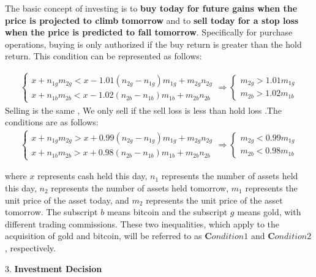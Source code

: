\documentclass{mcmthesis}
\begin{document}
The basic concept of investing is to \textbf{buy today for future gains when the price is projected to climb tomorrow} and to \textbf{sell today for a stop loss when the price is predicted to fall tomorrow}. Specifically for purchase operations, buying is only authorized if the buy return is greater than the hold return. This condition can be represented as follows:



\begin{align}
	\left\{\begin{array}{l}
		x+n_{1g}m_{2g}<x-1.01(n_{2g}-n_{1g})m_{1g}+m_{2g}n_{2g} \\
		x+n_{1b}m_{2b}<x-1.02(n_{2b}-n_{1b})m_{1b}+m_{2b}n_{2b}
	\end{array}
	\right. \Rightarrow
	\left\{\begin{array}{l}
		m_{2g}>1.01 m_{1g} \\
		m_{2b}>1.02 m_{1b}
	\end{array}\right.
	\label{earn_condition}
\end{align}
Selling is the same , We only sell if the sell loss is less than hold loss .The conditions are as follows:  
\begin{align}
\left\{\begin{array}{l}
x+n_{1g}m_{2g}>x+0.99(n_{2g}-n_{1g})m_{1g}+m_{2g}n_{2g} \\
x+n_{1b}m_{2b}>x+0.98(n_{2b}-n_{1b})m_{1b}+m_{2b}n_{2b}
\end{array}
\right. \Rightarrow
\left\{\begin{array}{l}
m_{2g}<0.99 m_{1g} \\
m_{2b}<0.98 m_{1b}
\end{array}\right.
\label{earn_condition}
\end{align}


where $x$ represents cash held this day, $n_{1}$ represents the number of assets held this day, $n_{2}$ represents the number of assets held tomorrow, $m_{1}$ represents the unit price of the asset today, and $m_{2}$ represents the unit price of the asset tomorrow. The subscript $b$ means bitcoin and the subscript $g$ means gold, with different trading commissions. These two inequalities, which apply to the acquisition of gold and bitcoin, will be referred to as $\boldsymbol Condition 1$ and  $\boldsymbol Condition 2$, respectively.


3. \textbf{Investment Decision}
\end{document}
